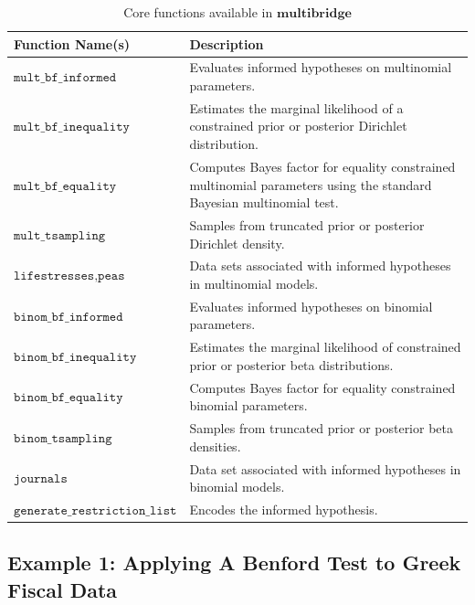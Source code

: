 \documentclass[
  english,
  man,floatsintext]{apa6}
\begin{document}
\begin{table}[H]
\caption {Core functions available in $\textbf{multibridge}$}
\label{table:core_functions}
\begin{center}
\begin{tabular}{p{5.5cm}p{10.5cm}}
        \toprule
Function Name(s) & Description \\\midrule
$\texttt{mult\_bf\_informed}$ & Evaluates informed hypotheses on multinomial parameters.  \\
$\texttt{mult\_bf\_inequality}$ & Estimates the marginal likelihood of a constrained prior or posterior Dirichlet distribution.  \\
$\texttt{mult\_bf\_equality}$ & Computes Bayes factor for equality constrained multinomial parameters using the standard Bayesian multinomial test.  \\
$\texttt{mult\_tsampling}$ & Samples from truncated prior or posterior Dirichlet density.\\
$ \texttt{lifestresses}, \texttt{peas}$ & Data sets associated with informed hypotheses in multinomial models.\\\midrule
$\texttt{binom\_bf\_informed}$ & Evaluates informed hypotheses on binomial parameters.  \\
$\texttt{binom\_bf\_inequality}$ & Estimates the marginal likelihood of constrained prior or posterior beta distributions.\\
$\texttt{binom\_bf\_equality}$ & Computes Bayes factor for equality constrained binomial parameters.  \\
$\texttt{binom\_tsampling}$ & Samples from truncated prior or posterior beta densities.\\
$ \texttt{journals}$ & Data set associated with informed hypotheses in binomial models.\\\midrule
$ \texttt{generate\_restriction\_list}$ & Encodes the informed hypothesis.\\
\bottomrule
\end{tabular}
\end{center}
\end{table}

\hypertarget{example-1-applying-a-benford-test-to-greek-fiscal-data}{%
\subsection{Example 1: Applying A Benford Test to Greek Fiscal Data}\label{example-1-applying-a-benford-test-to-greek-fiscal-data}}
\end{document}
